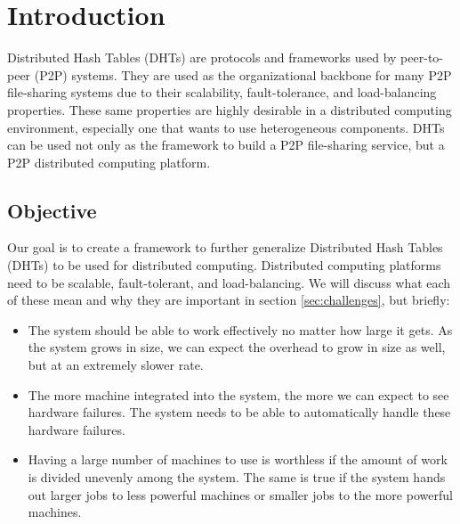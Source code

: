 \chapter{Introduction}
\label{chapter:intro}



Distributed Hash Tables (DHTs) are protocols and frameworks used by peer-to-peer (P2P) systems.
They are used as the organizational backbone for many P2P file-sharing systems due to their scalability, fault-tolerance, and load-balancing properties.
These same properties are highly desirable in a distributed computing environment, especially one that wants to use heterogeneous components.
DHTs can be used not only as the framework to build a P2P file-sharing service, but a P2P distributed computing platform.


\section{Objective}
Our goal is to create a framework to further generalize Distributed Hash Tables (DHTs) to be used for distributed computing.
Distributed computing platforms need to be scalable, fault-tolerant, and load-balancing.
We will discuss what each of these mean and why they are important in section \ref{sec:challenges}, but briefly:

\begin{itemize}
	\item The system should be able to work effectively no matter how large it gets.
	As the system grows in size, we can expect the overhead to grow in size as well, but at an extremely slower rate.
	\item The more machine integrated into the system, the more we can expect to see hardware failures.
	The system needs to be able to automatically handle these hardware failures.
	\item Having a large number of machines to use is worthless if the amount of work is divided unevenly among the system.
	The same is true if the system hands out larger jobs to less powerful machines or smaller jobs to the more powerful machines.
\end{itemize}


